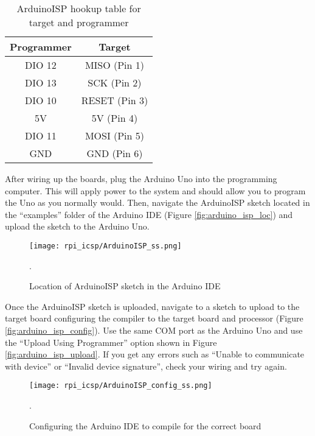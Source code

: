 \begin{table}[h!]
    \caption[ArduinoISP Hookup Guide]{ArduinoISP hookup table for target and programmer}
    \begin{tabular}{ c | c }
        \toprule
        Programmer & Target \\

        \midrule
        DIO 12  & MISO (Pin 1)  \\
        DIO 13  & SCK (Pin 2)   \\
        DIO 10  & RESET (Pin 3) \\
        5V      & 5V (Pin 4)    \\
        DIO 11  & MOSI (Pin 5)  \\
        GND     & GND (Pin 6)   \\

        \bottomrule
    \end{tabular}
\end{table}

After wiring up the boards, plug the Arduino Uno into the programming computer. This will apply power to the system and should allow you to program the Uno as you normally would. Then, navigate the ArduinoISP sketch located in the “examples” folder of the Arduino IDE (Figure \ref{fig:arduino_isp_loc}) and upload the sketch to the Arduino Uno.

\begin{figure}
    \texttt{[image: rpi\_icsp/ArduinoISP\_ss.png]}
    \caption[ArduinoISP Example]{Location of ArduinoISP sketch in the Arduino IDE}.
\end{figure}

Once the ArduinoISP sketch is uploaded, navigate to a sketch to upload to the target board configuring the compiler to the target board and processor (Figure \ref{fig:arduino_isp_config}). 
Use the same COM port as the Arduino Uno and use the “Upload Using Programmer” option  shown in Figure \ref{fig:arduino_isp_upload}. 
If you get any errors such as “Unable to communicate with device” or “Invalid device signature”, check your wiring and try again.

\begin{figure}
    \texttt{[image: rpi\_icsp/ArduinoISP\_config\_ss.png]}
    \caption[ArduinoISP Config]{Configuring the Arduino IDE to compile for the correct board}.
\end{figure}

